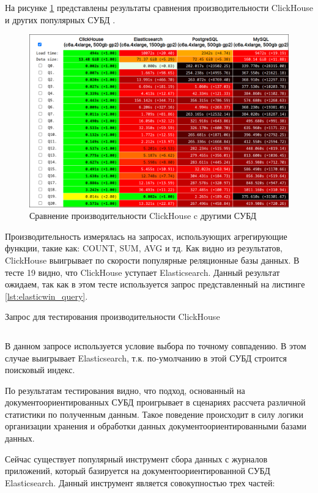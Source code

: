 \documentclass[14pt, russian]{scrartcl}
\begin{document}
На рисунке \ref{fig:clickbench} представлены результаты сравнения производительности ClickHouse и других популярных СУБД \cite{ClickBench}.


\begin{figure}[H]
	\centering
	\begin{minipage}[t]{.9\textwidth}
		\centering
		\includegraphics[width=.7\textwidth]{./imgs/clickbench.png}
	\end{minipage}
	\caption{Сравнение производительности ClickHouse c другими СУБД}
	\label{fig:clickbench}
\end{figure}

Производительность измерялась на запросах, использующих агрегирующие функции, такие как: COUNT, SUM, AVG и тд. Как видно из результатов, ClickHouse
выигрывает по скорости популярные реляционные базы данных. В тесте 19 видно, что ClickHouse уступает Elasticsearch. Данный результат ожидаем,
так как в этом тесте используется запрос представленный на листинге \ref{lst:elasticwin_query}.

\begin{listing}[H]
	\caption{Запрос для тестирования производительности ClickHouse}
	\label{lst:elasticwin_query}
	\inputminted[style=bw, frame=single,fontsize = \footnotesize, linenos=false, xleftmargin = 1.5em]{SQL}{./listings/elastic_win.sql}
\end{listing}

В данном запросе используется условие выбора по точному совпадению. В этом случае выигрывает Elasticsearch,
т.к. по-умолчанию в этой СУБД строится поисковый индекс.

По результатам тестирования видно, что подход, основанный на документоориентированных СУБД проигрывает в сценариях рассчета различной статистики по полученным данным. Такое поведение происходит в силу логики организации хранения и обработки данных документоориентированными базами данных.

Сейчас существует популярный инструмент сбора данных с журналов приложений, который базируется на документоориентированной СУБД Elasticsearch. Данный инструмент является совокупностью трех частей:
\end{document}
